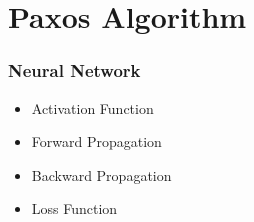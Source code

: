 
\ifx\allfiles\undefined

\fi
\section{Paxos Algorithm}
\begin{frame}
\frametitle{Neural Network}
	\small
	\begin{itemize}
		\item Activation Function 
		\item Forward Propagation
		\item Backward Propagation
		\item Loss Function
	\end{itemize}
\end{frame}
\ifx\allfiles\undefined

\fi

